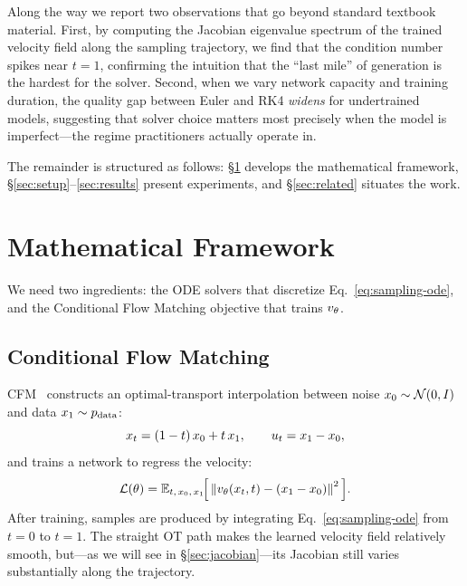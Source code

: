 \documentclass[11pt]{article}
\begin{document}
Along the way we report two observations that go beyond standard
textbook material.  First, by computing the Jacobian eigenvalue
spectrum of the trained velocity field along the sampling
trajectory, we find that the condition number spikes near $t=1$,
confirming the intuition that the ``last mile'' of generation is
the hardest for the solver.  Second, when we vary network capacity
and training duration, the quality gap between Euler and RK4
\emph{widens} for undertrained models, suggesting that solver
choice matters most precisely when the model is imperfect---the
regime practitioners actually operate in.

The remainder is structured as follows: \S\ref{sec:framework}
develops the mathematical framework, \S\ref{sec:setup}--\ref{sec:results}
present experiments, and \S\ref{sec:related} situates the work.

\section{Mathematical Framework}
\label{sec:framework}

We need two ingredients: the ODE solvers that discretize
Eq.~\eqref{eq:sampling-ode}, and the Conditional Flow Matching
objective that trains $v_\theta$.

\subsection{Conditional Flow Matching}
\label{sec:cfm}

CFM~\citep{lipman2023flow,tong2024improving} constructs an optimal-transport
interpolation between noise $x_0\sim\mathcal{N}(0,I)$ and data
$x_1\sim p_{\mathrm{data}}$:
\begin{equation}
\label{eq:ot-path}
x_t = (1-t)\,x_0 + t\,x_1,\qquad
u_t = x_1 - x_0,
\end{equation}
and trains a network to regress the velocity:
\begin{equation}
\label{eq:cfm-loss}
\mathcal{L}(\theta)
= \mathbb{E}_{t,\,x_0,\,x_1}\!\Big[
    \left\| v_\theta(x_t,t) - (x_1-x_0) \right\|^2
  \Big].
\end{equation}
After training, samples are produced by integrating
Eq.~\eqref{eq:sampling-ode} from $t{=}0$ to $t{=}1$.  The
straight OT path makes the learned velocity field relatively
smooth, but---as we will see in \S\ref{sec:jacobian}---its
Jacobian still varies substantially along the trajectory.
\end{document}

